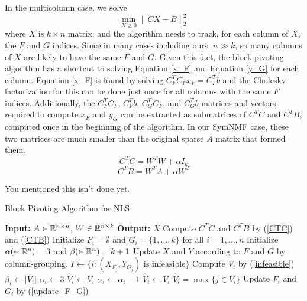 In the multicolumn case, we solve
\begin{equation} \label{multi_column_nls}
\min_{X \geq 0} \| C X - B \|_2^2
\end{equation}
where $X$ is $k \times n$ matrix, and the algorithm needs to track, for each column of
$X$, the $F$ and $G$ indices. Since in many cases including ours,
$n \gg k$, so many columns of $X$ are likely to have the same $F$ and $G$.
Given this fact, the block pivoting algorithm has a shortcut to solving
Equation \ref{x_F} and Equation \ref{y_G} for each column. Equation \ref{x_F} is found by solving
$C_F^T C_F x_F = C_F^T b$ and the Cholesky factorization for this can be done
just once for all columns with the same $F$ indices. Additionally, the
$C_F^T C_F$, $C_F^T b$, $C_G^T C_F$, and $C_G^T b$ matrices and vectors
required to compute $x_F$ and $y_G$ can be extracted as submatrices of $C^T C$
and $C^T B$, computed once in the beginning of the algorithm. In our SymNMF
case, these two matrices are much smaller than the original sparse $A$ matrix
that formed them.
\begin{equation} \label{CTC}
C^T C = W^T W + \alpha I_k
\end{equation}
\begin{equation} \label{CTB}
C^T B = W^T A + \alpha W^T
\end{equation}

{\color{red}You mentioned this isn't done yet.}

\begin{algorithm}
\caption{Block Pivoting Algorithm for NLS}
\label{nls_alg}
\begin{algorithmic}
\State \textbf{Input:} $A \in \mathbb{R}^{n \times n}$, $W \in \mathbb{R}^{n \times k}$
\State \textbf{Output:} $X$
\State Compute $C^T C$ and $C^T B$ by (\ref{CTC}) and (\ref{CTB})
\State Initialize $F_i = \emptyset$ and $G_i = \{1, ..., k\}$
       for all $i = 1, ..., n$
\State Initialize $\alpha (\in \mathbb{R}^n) = 3$ and $\beta (\in \mathbb{R}^n) = k + 1$
\Repeat
  \State Update $X$ and $Y$ according to $F$ and $G$ by column-grouping.
  \State $I \gets \{i : (X_{F_j}, Y_{G_j}) \text{ is infeasible}\}$
    \State Compute $V_i$ by (\ref{infeasible})
      \State $\beta_i \gets |V_i|$
      \State $\alpha_i \gets 3$
      \State $\hat{V}_i \gets V_i$
      \State $\alpha_i \gets \alpha_i - 1$
      \State $\hat{V}_i \gets V_i$
      \State $\hat{V}_i = \max \{j \in V_i\}$
    \EndIf
    \State Update $F_i$ and $G_i$ by (\ref{update_F_G})
  \EndFor
{}
\end{algorithmic}
\end{algorithm}

